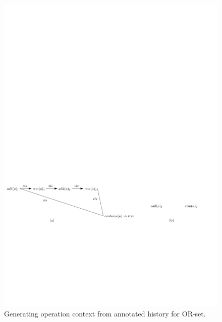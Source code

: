 \begin{figure}[t]
  \centering
  \includegraphics[width=1 \textwidth]{figures/PIC-his-anhis-context-2.pdf}
  \caption{Generating operation context from annotated history for OR-set.}

  \label{fig:generating operation context from annotated history for OR-set}
\end{figure}




